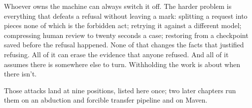 
Whoever owns the machine can always switch it off. The harder problem is everything that defeats a refusal without leaving a mark: splitting a request into pieces none of which is the forbidden act; retrying it against a different model; compressing human review to twenty seconds a case; restoring from a checkpoint saved before the refusal happened. None of that changes the facts that justified refusing. All of it can erase the evidence that anyone refused. And all of it assumes there is somewhere else to turn. Withholding the work is about when there isn't.


Those attacks land at nine positions, listed here once; two later chapters run them on an abduction and forcible transfer pipeline and on Maven.

